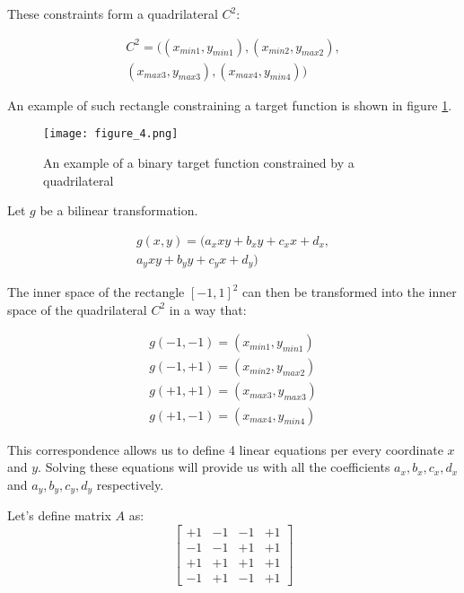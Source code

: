 \documentclass[
	a4paper, %
	10pt, %
	unnumberedsections, %
	twoside, %
]{LTJournalArticle}
\begin{document}
These constraints form a quadrilateral $C^2$:

\begin{equation}
	\begin{split}
    C^2 = ((x_{min1}, y_{min1}), (x_{min2}, y_{max2}),  \\ 
    (x_{max3}, y_{max3}), (x_{max4}, y_{min4}))
	\end{split}
	\label{eq:quadrilateral}
\end{equation}

An example of such rectangle constraining a target function is shown in figure \ref{fig:quadrilateral}.

\begin{figure} 
	\texttt{[image: figure\_4.png]}
	\caption{An example of a binary target function constrained by a quadrilateral}
	\label{fig:quadrilateral}
\end{figure}

Let $g$ be a bilinear transformation.

\begin{equation}
	\begin{split}
	g(x, y) = (a_xxy+b_xy+c_xx+d_x, \\
	a_yxy+b_yy+c_yx+d_y)
	\end{split}
	\label{eq:bilinear_transformation}
\end{equation}

The inner space of the rectangle $[-1, 1]^2$ can then be transformed into the inner space of the quadrilateral $C^2$ in a way that:

\begin{equation}
	\begin{array}{cc}
	g(-1, -1) = (x_{min1}, y_{min1}) \\
	g(-1, +1) = (x_{min2}, y_{max2}) \\
	g(+1, +1) = (x_{max3}, y_{max3}) \\
	g(+1, -1) = (x_{max4}, y_{min4})
	\end{array}
	\label{eq:corners}
\end{equation}

This correspondence allows us to define 4 linear equations per every coordinate $x$ and $y$. Solving these equations will provide us with all the coefficients $a_x, b_x, c_x, d_x$ and $a_y, b_y, c_y, d_y$ respectively.

Let's define matrix $A$ as:
\begin{equation}
	\begin{bmatrix}
	+1 & -1 & -1 & +1 \\
	-1 & -1 & +1 & +1 \\
	+1 & +1 & +1 & +1 \\
	-1 & +1 & -1 & +1
	\end{bmatrix}
	\label{eq:corners_matrix}
\end{equation}
\end{document}
